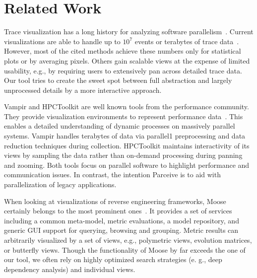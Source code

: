 \section{Related Work}
\label{sec:related_work}
Trace visualization has a long history for analyzing software
parallelism~\cite{TraceVisualization}. Current visualizations are able to
handle up to $10^7$ events or terabytes of trace data~\cite{State}. However,
most of the cited methods achieve these numbers only for statistical plots or
by averaging pixels. Others gain scalable views at the expense of limited
usability, e.g., by requiring users to extensively pan across detailed trace
data. Our tool tries to create the sweet spot between full abstraction and
largely unprocessed details by a more interactive approach.

Vampir and HPCToolkit are well known tools from the performance community. They
provide visualization environments to represent performance data~\cite{Vampir,
HPCToolkit}. This enables a detailed understanding of dynamic processes on
massively parallel systems. Vampir handles terabytes of data via parallel1
preprocessing and data reduction techniques during collection. HPCToolkit
maintains interactivity of its views by sampling the data rather than on-demand
processing during panning and zooming. Both tools focus on parallel software to
highlight performance and communication issues. In contrast, the intention
Parceive is to aid with parallelization of legacy applications.

When looking at visualizations of reverse engineering frameworks, Moose
certainly belongs to the most prominent ones~\cite{Moose}. It provides a set of
services including a common meta-model, metric evaluations, a model repository,
and generic GUI support for querying, browsing and grouping. Metric results can
arbitrarily visualized by a set of views, e.g., polymetric views, evolution
matrices, or butterfly views. Though the functionality of Moose by far exceeds
the one of our tool, we often rely on highly optimized search strategies (e.
g., deep dependency analysis) and individual views.